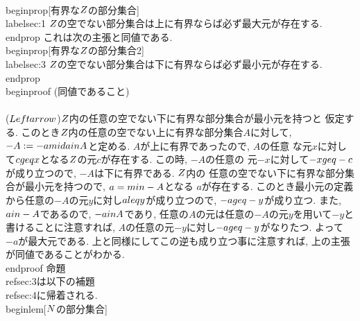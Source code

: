 \\begin{prop}[有界な$\\Z$の部分集合]
 \\label{sec:1}
 $\\Z$の空でない部分集合は上に有界ならば必ず最大元が存在する.
\\end{prop}
これは次の主張と同値である.
\\begin{prop}[有界な$\\Z$の部分集合2]
 \\label{sec:3}
 $\\Z$の空でない部分集合は下に有界ならば必ず最小元が存在する.
\\end{prop}
\\begin{proof}
 (同値であること)\\\\
 ($\\Leftarrow$)$\\Z$内の任意の空でない下に有界な部分集合が最小元を持つと
 仮定する. このとき$\\Z$内の任意の空でない上に有界な部分集合$A$に対して,
 $-A:=\\{-a\\mid a\\in A\\}$と定める. $A$が上に有界であったので, $A$の任意
 な元$x$に対して$c\\geq x$となる$\\Z$の元$c$が存在する. この時, $-A$の任意の
 元$-x$に対して$-x\\geq -c$が成り立つので, $-A$は下に有界である. $\\Z$内の
 任意の空でない下に有界な部分集合が最小元を持つので, $a=\\min -A$となる
 $a$が存在する. このとき最小元の定義から任意の$-A$の元$y$に対し$a\\leq y$が成り立つので, $-a\\geq -y$が成り立つ. 
 また, $a\\in -A$であるので, $-a\\in A$であり, 任意の$A$の元は任意の$-A$の元$y$を用いて$-y$と書けることに注意すれば, $A$の任意の元$-y$に対し$-a\\geq -y$がなりたつ. よって$-a$が最大元である.
 上と同様にしてこの逆も成り立つ事に注意すれば, 上の主張が同値であることがわかる.
\\end{proof}
命題\\ref{sec:3}は以下の補題\\ref{sec:4}に帰着される.
\\begin{lem}[$\\N$の部分集合]
